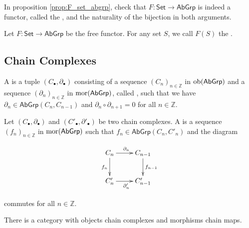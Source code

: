 \begin{exercise}
	In proposition \ref{prop:F_set_abgrp}, check that $F : \mathsf{Set} \to \mathsf{AbGrp}$ is indeed a functor, called the , and the naturality of the bijection in both arguments. 
\end{exercise}

\begin{definition}
	Let $F : \mathsf{Set} \to \mathsf{AbGrp}$ be the free functor. For any set $S$, we call $F(S)$ the .
\end{definition}

\subsection*{Chain Complexes}

\begin{definition}
	A  is a tuple $(C_\bullet,\partial_\bullet)$ consisting of a sequence $(C_n)_{n \in \mathbb{Z}}$ in $\operatorname{ob}(\mathsf{AbGrp})$ and a sequence $(\partial_n)_{n \in \mathbb{Z}}$ in $\operatorname{mor}(\mathsf{AbGrp})$, called , such that we have $\partial_{n} \in \mathsf{AbGrp}(C_n,C_{n - 1})$ and $\partial_n \circ \partial_{n + 1} = 0$ for all $n \in \mathbb{Z}$.
\end{definition}

\begin{definition}
	Let $(C_\bullet,\partial_\bullet)$ and $(C'_\bullet,\partial'_\bullet)$ be two chain complexes. A  is a sequence $(f_n)_{n \in \mathbb{Z}}$ in $\operatorname{mor}(\mathsf{AbGrp})$ such that $f_n \in \mathsf{AbGrp}(C_n,C'_n)$ and the diagram
	\begin{center}
		\begin{displaymath}
			\xymatrix{ C_n \ar[r]^{\partial_n}\ar[d]_{f_n} & C_{n - 1} \ar[d]^{f_{n - 1}} \\
			C'_n \ar[r]_{\partial'_n} & C'_{n - 1}}
		\end{displaymath}
	\end{center}
	\noindent commutes for all $n \in \mathbb{Z}$.
\end{definition}

\begin{proposition}
	There is a category with objects chain complexes and morphisms chain maps.
	\label{prop:comp}
\end{proposition}

